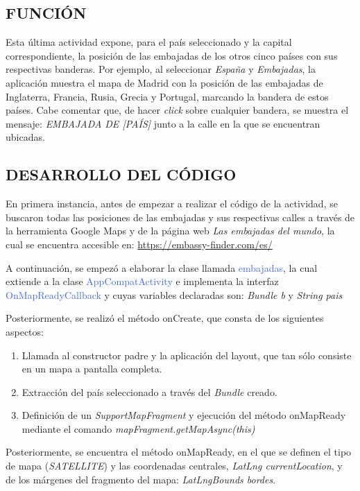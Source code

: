 \documentclass[letterpaper,twocolumn,openany,nodeprecatedcode,dvipsnames,nomultitoc]{dndbook}
\begin{document}
\begin{justify}
\subsection{FUNCIÓN}
\par 
Esta última actividad expone, para el país seleccionado y la capital correspondiente, la posición de las embajadas de los otros cinco países con sus respectivas banderas. Por ejemplo, al seleccionar \textit{España} y \textit{Embajadas}, la aplicación muestra el mapa de Madrid con la posición de las embajadas de Inglaterra, Francia, Rusia, Grecia y Portugal, marcando la bandera de estos países. Cabe comentar que, de hacer \textit{click} sobre cualquier bandera, se muestra el mensaje: \textit{EMBAJADA DE [PAÍS]} junto a la calle en la que se encuentran ubicadas.

\subsection{DESARROLLO DEL CÓDIGO}
\vspace{5pt}
\par 
En primera instancia, antes de empezar a realizar el código de la actividad, se buscaron todas las posiciones de las embajadas y sus respectivas calles a través de la herramienta Google Maps y de la página web \textit{Las embajadas del mundo}, la cual se encuentra accesible en: \url{https://embassy-finder.com/es/} 
\vspace{5pt}
\par
A continuación, se empezó a elaborar la clase llamada \textcolor{RoyalBlue}{embajadas}, la cual extiende a la clase \textcolor{RoyalBlue}{AppCompatActivity} e implementa la interfaz \textcolor{RoyalBlue}{OnMapReadyCallback} y cuyas variables declaradas son: 
\textit{Bundle b} y \textit{String pais}

\vspace{5pt}
\par
Posteriormente, se realizó el método \textcolor{BurntOrange}{onCreate}, que consta de los siguientes aspectos:
\begin{enumerate}
    \item Llamada al constructor padre y la aplicación del layout, que tan sólo consiste en un mapa a pantalla completa.
    \item Extracción del país seleccionado a través del \textit{Bundle} creado.
    \item Definición de un \textit{SupportMapFragment} y ejecución del método \textcolor{BurntOrange}{onMapReady} mediante el comando \textit{mapFragment.getMapAsync(this)}
\end{enumerate}
\vspace{5pt}
\par
Posteriormente, se encuentra el método \textcolor{BurntOrange}{onMapReady}, en el que se definen el tipo de mapa (\textit{SATELLITE}) y las coordenadas centrales, \textit{LatLng currentLocation},  y de los márgenes del fragmento del mapa: \textit{LatLngBounds bordes}.


\end{justify}
\end{document}

